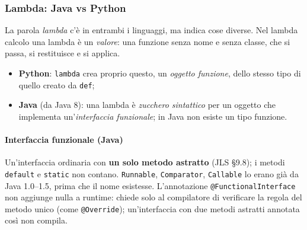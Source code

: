 \documentclass[a4paper,12pt]{article}
\begin{document}
\subsubsection{Lambda: Java vs Python}
La parola \emph{lambda} c'è in entrambi i linguaggi, ma indica cose diverse. Nel lambda calcolo
una lambda è un \emph{valore}: una funzione senza nome e senza classe, che si passa, si
restituisce e si applica.
\begin{itemize}[nosep]
  \item \textbf{Python}: \texttt{lambda} crea proprio questo, un \emph{oggetto funzione},
        dello stesso tipo di quello creato da \texttt{def};
  \item \textbf{Java} (da Java 8): una lambda è \emph{zucchero sintattico} per un oggetto
        che implementa un'\emph{interfaccia funzionale}; in Java non esiste un tipo funzione.
\end{itemize}

\paragraph{Interfaccia funzionale (Java)} Un'interfaccia ordinaria con \textbf{un solo metodo
astratto} (JLS §9.8); i metodi \texttt{default} e \texttt{static} non contano.
\texttt{Runnable}, \texttt{Comparator}, \texttt{Callable} lo erano già da Java 1.0--1.5, prima che
il nome esistesse. L'annotazione \texttt{@FunctionalInterface} non aggiunge nulla a runtime:
chiede solo al compilatore di verificare la regola del metodo unico (come \texttt{@Override});
un'interfaccia con due metodi astratti annotata così non compila.
\end{document}
